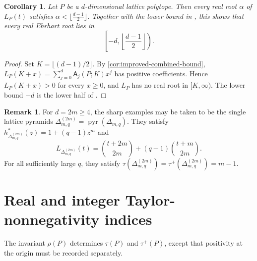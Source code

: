 \documentclass[reqno, 12pt]{article}
\numberwithin{equation}{section}
\newtheorem{corollary}[theorem]{Corollary}
\theoremstyle{definition}
\newtheorem{remark}[theorem]{Remark}
\newcommand{\A}{\mathsf{A}}
\begin{document}
\begin{corollary}\label{cor:improved-real-root-upper-bound}
Let $P$ be a $d$-dimensional lattice polytope.  Then every real root
$\alpha$ of $L_P(t)$ satisfies $\alpha<\lfloor\frac{d-1}{2}\rfloor$. Together with the lower bound in
\cite[Theorem~1.2(b)]{BeckEtAl2005}, this shows that every real Ehrhart root lies in
\[\left[-d,\left\lfloor\frac{d-1}{2}\right\rfloor\right).
\]
\end{corollary}
\begin{proof}
Set $K=\lfloor(d-1)/2\rfloor$.  By \cref{cor:improved-combined-bound},
$L_P(K+x)=\sum_{j=0}^{d}\A_j(P;K)x^j$ has positive coefficients.  Hence $L_P(K+x)>0$ for every $x\geq0$, and $L_P$ has no real root in $[K,\infty)$.  The lower bound $-d$ is the lower half of \cite[Theorem~1.2(b)]{BeckEtAl2005}.
\end{proof}

\begin{remark}
For $d=2m\geq4$, the sharp examples may be taken to be the single lattice pyramids $\Delta_{m,q}^{(2m)}=\operatorname{pyr}(\Delta_{m,q})$.
They satisfy
$h_{\Delta_{m,q}^{(2m)}}^*(z)=1+(q-1)z^m$
and
\[L_{\Delta_{m,q}^{(2m)}}(t)=\binom{t+2m}{2m}+(q-1)\binom{t+m}{2m}.
\]
For all sufficiently large $q$, they satisfy $\tau(\Delta_{m,q}^{(2m)})=\tau^+(\Delta_{m,q}^{(2m)})=m-1$.
\end{remark}


\section{Real and integer Taylor-nonnegativity indices}\label{sec:root-geometry}


The invariant $\rho(P)$ determines $\tau(P)$ and $\tau^+(P)$, except that positivity at the origin must be recorded separately.
\end{document}
